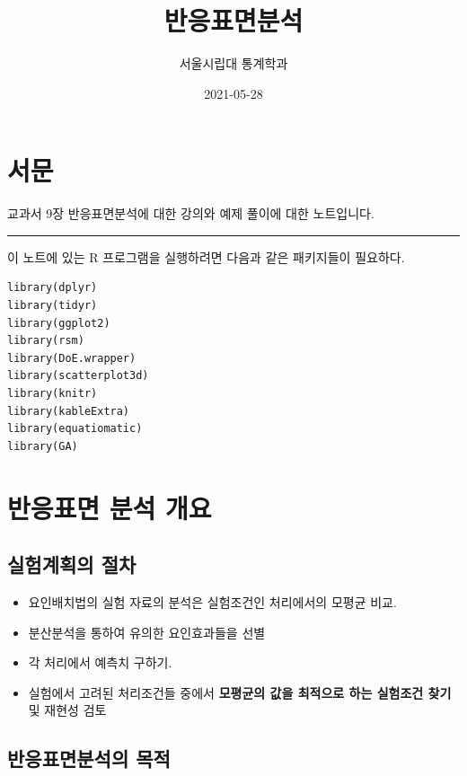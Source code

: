 \documentclass[
]{book}
\title{반응표면분석}
\author{서울시립대 통계학과}
\date{2021-05-28}
\theoremstyle{definition}
\theoremstyle{definition}
\theoremstyle{definition}
\theoremstyle{definition}
\theoremstyle{remark}
\begin{document}
\maketitle

{
\setcounter{tocdepth}{1}
\tableofcontents
}
\hypertarget{uxc11cuxbb38}{%
\chapter*{서문}\label{uxc11cuxbb38}}


교과서 9장 반응표면분석에 대한 강의와 예제 풀이에 대한 노트입니다.

\begin{center}\rule{0.5\linewidth}{0.5pt}\end{center}

이 노트에 있는 R 프로그램을 실행하려면 다음과 같은 패키지들이 필요하다.

\begin{verbatim}
library(dplyr)
library(tidyr)
library(ggplot2)
library(rsm)
library(DoE.wrapper)
library(scatterplot3d)
library(knitr)
library(kableExtra)
library(equatiomatic)
library(GA)
\end{verbatim}

\mainmatter

\hypertarget{responseintro}{%
\chapter{반응표면 분석 개요}\label{responseintro}}

\hypertarget{uxc2e4uxd5d8uxacc4uxd68duxc758-uxc808uxcc28}{%
\section{실험계획의 절차}\label{uxc2e4uxd5d8uxacc4uxd68duxc758-uxc808uxcc28}}

\begin{itemize}
\item
  요인배치법의 실험 자료의 분석은 실험조건인 처리에서의 모평균 비교.
\item
  분산분석을 통하여 유의한 요인효과들을 선별
\item
  각 처리에서 예측치 구하기.
\item
  실험에서 고려된 처리조건들 중에서 \textbf{모평균의 값을 최적으로 하는 실험조건 찾기} 및 재현성 검토
\end{itemize}

\hypertarget{uxbc18uxc751uxd45cuxba74uxbd84uxc11duxc758-uxbaa9uxc801}{%
\section{반응표면분석의 목적}\label{uxbc18uxc751uxd45cuxba74uxbd84uxc11duxc758-uxbaa9uxc801}}
\end{document}
